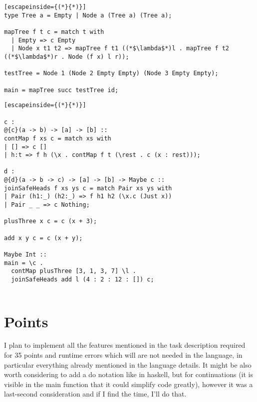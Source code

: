 \documentclass{article}
\begin{document}
	\begin{lstlisting}[escapeinside={(*}{*)}]
type Tree a = Empty | Node a (Tree a) (Tree a);

mapTree f t c = match t with
  | Empty => c Empty
  | Node x t1 t2 => mapTree f t1 ((*$\lambda$*)l . mapTree f t2 ((*$\lambda$*)r . Node (f x) l r));

testTree = Node 1 (Node 2 Empty Empty) (Node 3 Empty Empty);

main = mapTree succ testTree id;
	\end{lstlisting}
	\begin{lstlisting}[escapeinside={(*}{*)}]

c :
@{c}(a -> b) -> [a] -> [b] ::
contMap f xs c = match xs with
| [] => c []
| h:t => f h (\x . contMap f t (\rest . c (x : rest)));

d :
@{d}(a -> b -> c) -> [a] -> [b] -> Maybe c ::
joinSafeHeads f xs ys c = match Pair xs ys with
| Pair (h1:_) (h2:_) => f h1 h2 (\x.c (Just x))
| Pair _ _ => c Nothing;

plusThree x c = c (x + 3);

add x y c = c (x + y);

Maybe Int ::
main = \c .
  contMap plusThree [3, 1, 3, 7] \l .
  joinSafeHeads add l (4 : 2 : 12 : []) c;


	\end{lstlisting}
	\section{Points}
	I plan to implement all the features mentioned in the task description required for 35 points and runtime errors which will are not needed in the language, in particular everything already mentioned in the language details. It might be also worth considering to add a do notation like in haskell, but for continuations (it is visible in the main function that it could simplify code greatly), however it was a last-second consideration and if I find the time, I'll do that.
\end{document}
